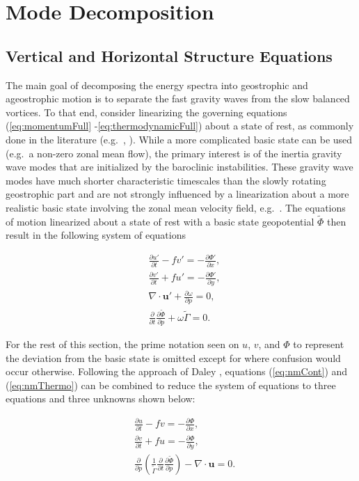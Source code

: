 \newpage
\chapter{Mode Decomposition}
\label{ch:ch2}

\section{Vertical and Horizontal Structure Equations}
The main goal of decomposing the energy spectra into geostrophic and ageostrophic motion is to separate the fast gravity waves from the slow balanced vortices. To that end, consider linearizing the governing equations (\ref{eq:momentumFull} -\ref{eq:thermodynamicFull}) about a state of rest, as commonly done in the literature (e.g.\ \cite{Daley1991}, \cite{Kasahara1981}). While a more complicated basic state can be used (e.g.\ a non-zero zonal mean flow), the primary interest is of the inertia gravity wave modes that are initialized by the baroclinic instabilities. These gravity wave modes have  much shorter characteristic timescales than the slowly rotating geostrophic part and are not strongly influenced by a linearization about a more realistic basic state involving the zonal mean velocity field, e.g.\ \cite{Dickinson1972}. The equations of motion linearized about a state of rest with a basic state geopotential $\tilde{\Phi}$ then result in the following system of equations

\begin{align}
&\frac{\partial u'} {\partial t} - fv' = -\frac{\partial \Phi'}{\partial x},\label{eq:nmMomentum}\\
&\frac{\partial v'} {\partial t} + fu' = -\frac{\partial \Phi'}{\partial y},\\
&\nabla \cdot \mathbf{u'} + \frac{\partial \omega}{\partial p} = 0,\label{eq:nmCont}\\
&\frac{\partial}{\partial t} \frac{\partial \tilde{\Phi}}{\partial p} + \omega \tilde{\Gamma} \label{eq:nmThermo} = 0.
\end{align}

For the rest of this section, the prime notation seen on $u$, $v$, and $\Phi$ to represent the deviation from the basic state is omitted except for where confusion would occur otherwise. Following the approach of Daley \cite{Daley1991}, equations (\ref{eq:nmCont}) and (\ref{eq:nmThermo}) can be combined to reduce the system of equations to three equations and three unknowns shown below:

\begin{align}
&\frac{\partial u} {\partial t} - fv = -\frac{\partial \Phi}{\partial x},\label{eq:nmLinMom}\\
&\frac{\partial v} {\partial t} + fu = -\frac{\partial \Phi}{\partial y},\\
&\frac{\partial}{\partial p} \left( \frac{1}{\tilde{\Gamma}} \frac{\partial }{\partial t} \frac{\partial \tilde{\Phi}}{\partial p}\right) - \nabla \cdot \mathbf{u} = 0. \label{eq:nmThermoHydro}
\end{align}

